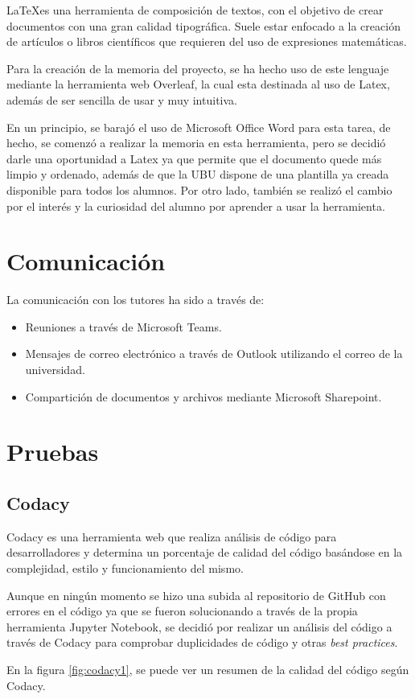 \LaTeX es una herramienta de composición de textos, con el objetivo de crear documentos con una gran calidad tipográfica. Suele estar enfocado a la creación de artículos o libros científicos que requieren del uso de expresiones matemáticas.

Para la creación de la memoria del proyecto, se ha hecho uso de este lenguaje mediante la herramienta web Overleaf, la cual esta destinada al uso de Latex, además de ser sencilla de usar y muy intuitiva.

En un principio, se barajó el uso de Microsoft Office Word para esta tarea, de hecho, se comenzó a realizar la memoria en esta herramienta, pero se decidió darle una oportunidad a Latex ya que permite que el documento quede más limpio y ordenado, además de que la UBU dispone de una plantilla ya creada disponible para todos los alumnos.
Por otro lado, también se realizó el cambio por el interés y la curiosidad del alumno por aprender a usar la herramienta.


\section{Comunicación}

La comunicación con los tutores ha sido a través de:

\begin{itemize}
    \item Reuniones a través de Microsoft Teams.
    \item Mensajes de correo electrónico a través de Outlook utilizando el correo de la universidad.
    \item Compartición de documentos y archivos mediante Microsoft Sharepoint.
\end{itemize}


\section{Pruebas}

\subsection{Codacy}

Codacy\cite{Codacy} es una herramienta web que realiza análisis de código para desarrolladores y determina un porcentaje de calidad del código basándose en la complejidad, estilo y funcionamiento del mismo.

Aunque en ningún momento se hizo una subida al repositorio de GitHub con errores en el código ya que se fueron solucionando a través de la propia herramienta Jupyter Notebook, se decidió por realizar un análisis del código a través de Codacy para comprobar duplicidades de código y otras \textit{best practices}.

En la figura \ref{fig:codacy1}, se puede ver un resumen de la calidad del código según Codacy.

\label{fig:codacy1}